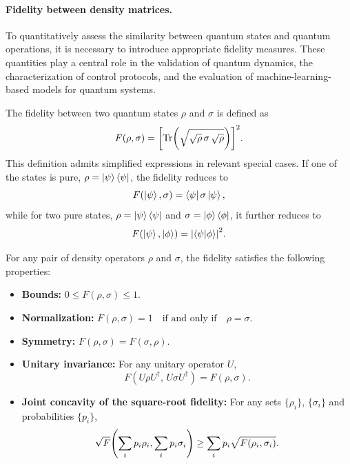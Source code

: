 \paragraph{Fidelity between density matrices.}
To quantitatively assess the similarity between quantum states and quantum operations, it is necessary to introduce appropriate fidelity measures. These quantities play a central role in the validation of quantum dynamics, the characterization of control protocols, and the evaluation of machine-learning-based models for quantum systems.

The fidelity between two quantum states $\rho$ and $\sigma$ is defined as \cite{Jozsa1994}
\begin{equation}
    \label{eq:fidelity}
    F(\rho,\sigma)
    =
    \qty[
    \Tr\!\qty(
    \sqrt{\sqrt{\rho}\,\sigma\,\sqrt{\rho}}
    )
    ]^2.
\end{equation}
This definition admits simplified expressions in relevant special cases. If one of the states is pure, $\rho = \ket{\psi}\bra{\psi}$, the fidelity reduces to
\begin{equation}
    F(\ket{\psi},\sigma)
    =
    \bra{\psi}\sigma\ket{\psi},
\end{equation}
while for two pure states, $\rho = \ket{\psi}\bra{\psi}$ and $\sigma = \ket{\phi}\bra{\phi}$, it further reduces to
\begin{equation}
    F(\ket{\psi},\ket{\phi})
    =
    \qty|\braket{\psi}{\phi}|^2.
\end{equation}

For any pair of density operators $\rho$ and $\sigma$, the fidelity satisfies the following properties:
\begin{itemize}
    \item \textbf{Bounds:}
          $0 \leq F(\rho,\sigma) \leq 1.$

    \item \textbf{Normalization:}
          $F(\rho,\sigma) = 1 \quad \text{if and only if} \quad \rho = \sigma.$

    \item \textbf{Symmetry:}
          $F(\rho,\sigma) = F(\sigma,\rho).$

    \item \textbf{Unitary invariance:}
          For any unitary operator $U$,
          \begin{equation}
              F(U\rho U^\dagger,\, U\sigma U^\dagger) = F(\rho,\sigma).
          \end{equation}

    \item \textbf{Joint concavity of the square-root fidelity:}
          For any sets $\{\rho_i\}$, $\{\sigma_i\}$ and probabilities $\{p_i\}$,
          \begin{equation}
              \sqrt{F}\qty(\sum_i p_i \rho_i, \sum_i p_i \sigma_i ) \geq \sum_i p_i \sqrt{F(\rho_i,\sigma_i)}.
          \end{equation}
\end{itemize}

